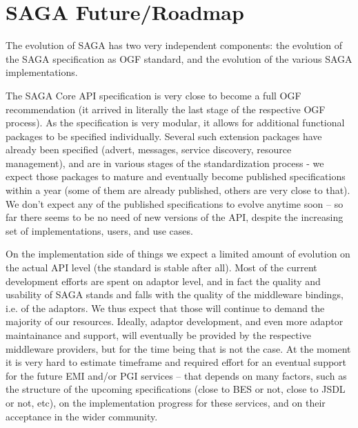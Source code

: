 \documentclass[12pt]{article}
\begin{document}


\section{SAGA Future/Roadmap}

 The evolution of SAGA has two very independent components: the
 evolution of the SAGA specification as OGF standard, and the
 evolution of the various SAGA implementations.

 The SAGA Core API specification is very close to become a full OGF
 recommendation (it arrived in literally the last stage of the
 respective OGF process).  As the specification is very modular, it
 allows for additional functional packages to be specified
 individually.  Several such extension packages have already been
 specified (advert, messages, service discovery, resource management),
 and are in various stages of the standardization process - we expect
 those packages to mature and eventually become published
 specifications within a year (some of them are already published,
 others are very close to that).  We don't expect any of the published
 specifications to evolve anytime soon -- so far there seems to be no
 need of new versions of the API, despite the increasing set of
 implementations, users, and use cases.

 On the implementation side of things we expect a limited amount of
 evolution on the actual API level (the standard is stable after all).
 Most of the current development efforts are spent on adaptor level, and
 in fact the quality and usability of SAGA stands and falls with the
 quality of the middleware bindings, i.e. of the adaptors.  We thus
 expect that those will continue to demand the majority of our
 resources.  Ideally, adaptor development, and even more adaptor
 maintainance and support, will eventually be provided by the respective
 middleware providers, but for the time being that is not the case.  At
 the moment it is very hard to estimate timeframe and required effort
 for an eventual support for the future EMI and/or PGI services -- that
 depends on many factors, such as the structure of the upcoming
 specifications (close to BES or not, close to JSDL or not, etc), on the
 implementation progress for these services, and on their acceptance in
 the wider community.
\end{document}
